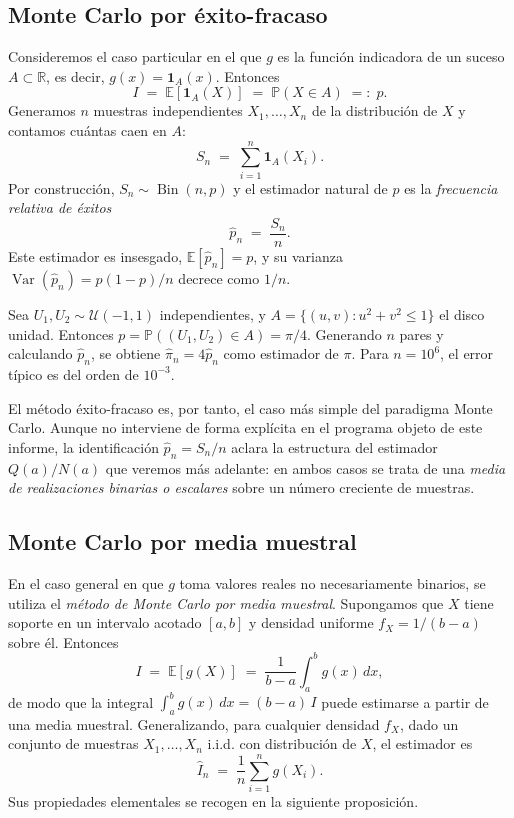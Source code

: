 \subsection{Monte Carlo por éxito-fracaso}
\label{subsec:mc-exito-fracaso}

Consideremos el caso particular en el que $g$ es la función indicadora de un suceso $A \subset \mathbb{R}$, es decir, $g(x) = \mathbf{1}_A(x)$. Entonces
\[
    I \;=\; \mathbb{E}[\mathbf{1}_A(X)] \;=\; \mathbb{P}(X \in A) \;=:\; p.
\]
Generamos $n$ muestras independientes $X_1, \ldots, X_n$ de la distribución de $X$ y contamos cuántas caen en $A$:
\[
    S_n \;=\; \sum_{i=1}^{n} \mathbf{1}_A(X_i).
\]
Por construcción, $S_n \sim \operatorname{Bin}(n, p)$ y el estimador natural de $p$ es la \emph{frecuencia relativa de éxitos}
\[
    \hat{p}_n \;=\; \frac{S_n}{n}.
\]
Este estimador es insesgado, $\mathbb{E}[\hat{p}_n] = p$, y su varianza $\operatorname{Var}(\hat{p}_n) = p(1-p)/n$ decrece como $1/n$.

\begin{ejemplo}[Estimación de $\pi$]
\label{ej:pi-mc}
Sea $U_1, U_2 \sim \mathcal{U}(-1,1)$ independientes, y $A = \{(u,v) : u^2 + v^2 \leq 1\}$ el disco unidad. Entonces $p = \mathbb{P}((U_1, U_2) \in A) = \pi/4$. Generando $n$ pares y calculando $\hat{p}_n$, se obtiene $\hat{\pi}_n = 4\hat{p}_n$ como estimador de $\pi$. Para $n = 10^6$, el error típico es del orden de $10^{-3}$.
\end{ejemplo}

El método éxito-fracaso es, por tanto, el caso más simple del paradigma Monte Carlo. Aunque no interviene de forma explícita en el programa objeto de este informe, la identificación $\hat{p}_n = S_n/n$ aclara la estructura del estimador $Q(a)/N(a)$ que veremos más adelante: en ambos casos se trata de una \emph{media de realizaciones binarias o escalares} sobre un número creciente de muestras.

\subsection{Monte Carlo por media muestral}
\label{subsec:mc-media-muestral}

En el caso general en que $g$ toma valores reales no necesariamente binarios, se utiliza el \emph{método de Monte Carlo por media muestral}. Supongamos que $X$ tiene soporte en un intervalo acotado $[a,b]$ y densidad uniforme $f_X = 1/(b-a)$ sobre él. Entonces
\[
    I \;=\; \mathbb{E}[g(X)] \;=\; \frac{1}{b-a}\int_a^b g(x)\, dx,
\]
de modo que la integral $\int_a^b g(x)\, dx = (b-a)\, I$ puede estimarse a partir de una media muestral. Generalizando, para cualquier densidad $f_X$, dado un conjunto de muestras $X_1, \ldots, X_n$ i.i.d. con distribución de $X$, el estimador es
\begin{equation}
    \widehat{I}_n \;=\; \frac{1}{n}\sum_{i=1}^{n} g(X_i).
    \label{eq:estimador-media-muestral}
\end{equation}
Sus propiedades elementales se recogen en la siguiente proposición.

